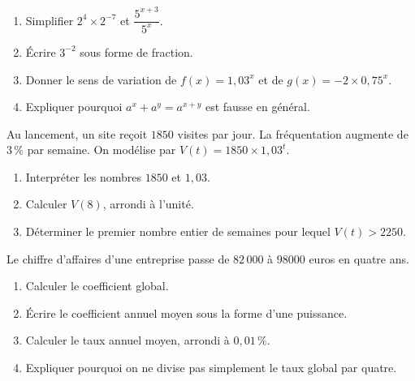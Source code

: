 
\begin{exercice}
\begin{enumerate}
\item Simplifier $2^4\times2^{-7}$ et $\dfrac{5^{x+3}}{5^x}$.
\item Écrire $3^{-2}$ sous forme de fraction.
\item Donner le sens de variation de $f(x)=1{,}03^x$ et de $g(x)=-2\times0{,}75^x$.
\item Expliquer pourquoi $a^x+a^y=a^{x+y}$ est fausse en général.
\end{enumerate}
\end{exercice}
\begin{exercice}
Au lancement, un site reçoit $1850$ visites par jour. La fréquentation augmente de $3\,\%$ par semaine. On modélise par $V(t)=1850\times1{,}03^t$.
\begin{enumerate}
\item Interpréter les nombres $1850$ et $1{,}03$.
\item Calculer $V(8)$, arrondi à l'unité.
\item Déterminer le premier nombre entier de semaines pour lequel $V(t)>2250$.
\end{enumerate}
\end{exercice}
\begin{exercice}
Le chiffre d'affaires d'une entreprise passe de $82\,000$ à $98000$ euros en quatre ans.
\begin{enumerate}
\item Calculer le coefficient global.
\item Écrire le coefficient annuel moyen sous la forme d'une puissance.
\item Calculer le taux annuel moyen, arrondi à $0{,}01\,\%$.
\item Expliquer pourquoi on ne divise pas simplement le taux global par quatre.
\end{enumerate}
\end{exercice}

